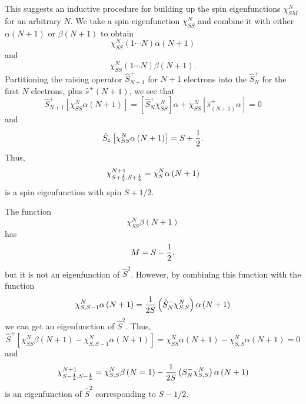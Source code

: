 This suggests an inductive procedure for building up the spin 
eigenfunctions $\chi^N_{SM}$ for an arbitrary $N$.  We take a spin 
eigenfunction $\chi^N_{SS}$ and combine it with either $\alpha (N+1)$ 
or $\beta (N+1)$ to obtain
\begin{equation}
\chi^N_{SS} \left( 1 \cdots N \right) \alpha \left( N + 1 \right)
\end{equation}
and
\begin{equation}
\chi^N_{SS} \left( 1 \cdots N \right) \beta \left( N + 1 \right) .
\end{equation}
Partitioning the raising operator ${\hat S}^+_{N+1}$ for $N + 1$ 
electrons into the ${\hat S}^+_N$ for the first $N$ electrons, plus 
${\hat s}^+ (N+1)$, we see that
\begin{equation}
{\hat S}^+_{N+1} \left[ \chi^N_{SS} \alpha \left( N + 1 \right) 
\right] = \left[ {\hat S}^+_N \chi^N_{SS} \right] \alpha + 
\chi^N_{SS} \left[ {\hat s}^+_{(N+1)} \alpha \right] = 0
\end{equation}
and
\begin{equation}
{\hat S}_z \left[ \chi^N_{SS} \alpha \left( N + 1 \right) \right] = 
S + {1 \over 2}.
\end{equation}
Thus,
\begin{equation}
\chi^{N+1}_{S+{1 \over 2},S+{1 \over 2}} = \chi^N_S \alpha 
\left( N + 1 \right) 
\label{chap4app-eqno18}
\end{equation}
is a spin eigenfunction with spin $S + 1/2$.

The function
\begin{equation}
\chi^N_{SS} \beta \left( N + 1 \right)
\end{equation}
has
\begin{equation}
M = S - {1 \over 2} ,
\end{equation}
but it is not an eigenfunction of ${\hat S}^2$.  However, by combining this 
function with the function
\begin{equation}
\chi^N_{S,S-1} \alpha \left( N + 1 \right) = {1 \over 2S} \left( 
{\hat S}^-_N \chi^N_{S,S} \right) \alpha \left( N + 1 \right)
\end{equation}
we can get an eigenfunction of ${\hat S}^2$.  Thus,
\begin{equation}
{\hat S}^+ \left[ \chi^N_{SS} \beta \left( N + 1 \right) - 
\chi^N_{S,S-1} \alpha \left( N + 1 \right) \right] = \chi^N_{SS} 
\alpha \left( N + 1 \right) - \chi^N_{S,S} \alpha \left( N + 1 \right) = 0
\end{equation}
and
\begin{equation}
\chi^{N+1}_{S-{1 \over 2},S-{1 \over 2}} = \chi^N_{S,S} \beta \left( 
N = 1 \right) - {1 \over 2S} \left( S^-_N \chi^N_{S,S} \right) 
\alpha \left( N + 1 \right)
\label{chap4app-eqno19}
\end{equation}
is an eigenfunction of ${\hat S}^2$ corresponding to $S - 1/2$.

